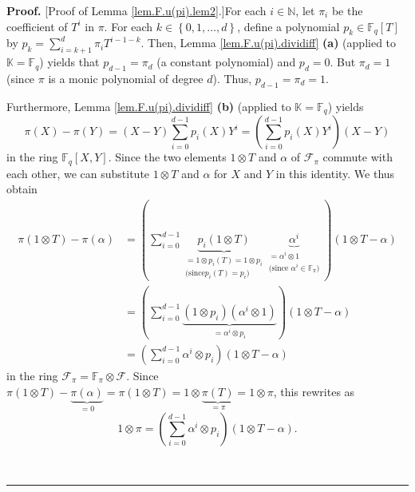 \documentclass[numbers=enddot,12pt,final,onecolumn,notitlepage]{scrartcl}%
\theoremstyle{definition}
\newenvironment{proof}[1][Proof]{\noindent\textbf{#1.} }{\ \rule{0.5em}{0.5em}}
\let\sumnonlimits\sum
\renewcommand{\sum}{\sumnonlimits\limits}
\begin{document}
\begin{proof}
[Proof of Lemma \ref{lem.F.u(pi).lem2}.]For each $i\in\mathbb{N}$, let
$\pi_{i}$ be the coefficient of $T^{i}$ in $\pi$. For each $k\in\left\{
0,1,\ldots,d\right\}  $, define a polynomial $p_{k}\in\mathbb{F}_{q}\left[
T\right]  $ by $p_{k}=\sum_{i=k+1}^{d}\pi_{i}T^{i-1-k}$. Then, Lemma
\ref{lem.F.u(pi).dividiff} \textbf{(a)} (applied to $\mathbb{K}=\mathbb{F}%
_{q}$) yields that $p_{d-1}=\pi_{d}$ (a constant polynomial) and $p_{d}=0$.
But $\pi_{d}=1$ (since $\pi$ is a monic polynomial of degree $d$). Thus,
$p_{d-1}=\pi_{d}=1$.

Furthermore, Lemma \ref{lem.F.u(pi).dividiff} \textbf{(b)} (applied to
$\mathbb{K}=\mathbb{F}_{q}$) yields
\[
\pi\left(  X\right)  -\pi\left(  Y\right)  =\left(  X-Y\right)  \sum
_{i=0}^{d-1}p_{i}\left(  X\right)  Y^{i}=\left(  \sum_{i=0}^{d-1}p_{i}\left(
X\right)  Y^{i}\right)  \left(  X-Y\right)
\]
in the ring $\mathbb{F}_{q}\left[  X,Y\right]  $. Since the two elements
$1\otimes T$ and $\alpha$ of $\mathcal{F}_{\pi}$ commute with each other, we
can substitute $1\otimes T$ and $\alpha$ for $X$ and $Y$ in this identity. We
thus obtain%
\begin{align*}
\pi\left(  1\otimes T\right)  -\pi\left(  \alpha\right)   &  =\left(
\sum_{i=0}^{d-1}\underbrace{p_{i}\left(  1\otimes T\right)  }%
_{\substack{=1\otimes p_{i}\left(  T\right)  =1\otimes p_{i}\\\text{(since
}p_{i}\left(  T\right)  =p_{i}\text{)}}}\underbrace{\alpha^{i}}%
_{\substack{=\alpha^{i}\otimes1\\\text{(since }\alpha^{i}\in\mathbb{F}_{\pi
}\text{)}}}\right)  \left(  1\otimes T-\alpha\right) \\
&  =\left(  \sum_{i=0}^{d-1}\underbrace{\left(  1\otimes p_{i}\right)  \left(
\alpha^{i}\otimes1\right)  }_{=\alpha^{i}\otimes p_{i}}\right)  \left(
1\otimes T-\alpha\right) \\
&  =\left(  \sum_{i=0}^{d-1}\alpha^{i}\otimes p_{i}\right)  \left(  1\otimes
T-\alpha\right)
\end{align*}
in the ring $\mathcal{F}_{\pi}=\mathbb{F}_{\pi}\otimes\mathcal{F}$. Since
$\pi\left(  1\otimes T\right)  -\underbrace{\pi\left(  \alpha\right)  }%
_{=0}=\pi\left(  1\otimes T\right)  =1\otimes\underbrace{\pi\left(  T\right)
}_{=\pi}=1\otimes\pi$, this rewrites as
\begin{equation}
1\otimes\pi=\left(  \sum_{i=0}^{d-1}\alpha^{i}\otimes p_{i}\right)  \left(
1\otimes T-\alpha\right)  . \label{pf.lem.F.u(pi).lem2.1}%
\end{equation}



\end{proof}
\end{document}
